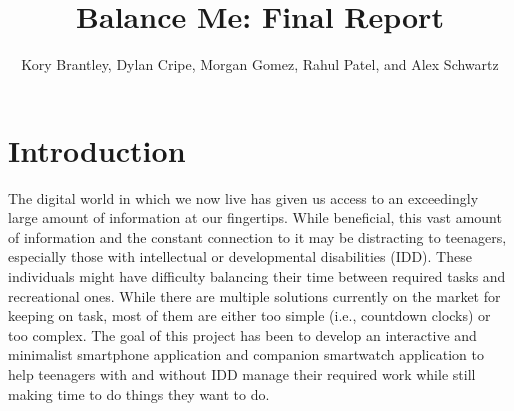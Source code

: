 \documentclass{sigchi}
\def\plaintitle{Balance Me: Final Report}
\def\plainauthor{Kory Brantley, Dylan Cripe, Morgan Gomez, Rahul Patel,
and Alex Schwartz}
\begin{document}
\title{\plaintitle}

\author{
\plainauthor
}

\newenvironment{myitemize}
{ \begin{itemize}
    \setlength{\itemsep}{0pt}
    \setlength{\parskip}{0pt}
    \setlength{\parsep}{0pt}     }
{ \end{itemize}                  } 

\maketitle

\section{Introduction}

The digital world in which we now live has given us access to an exceedingly
large amount of information at our fingertips. While beneficial, this vast
amount of information and the constant connection to it may be distracting to
teenagers, especially those with intellectual or developmental disabilities
(IDD). These individuals might have difficulty balancing their time between
required tasks and recreational ones. While there are multiple solutions
currently on the market for keeping on task, most of them are either too simple
(i.e., countdown clocks) or too complex. The goal of this project has been to
develop an interactive and minimalist smartphone application and companion
smartwatch application to help teenagers with and without IDD manage their
required work while still making time to do things they want to do.
\end{document}
